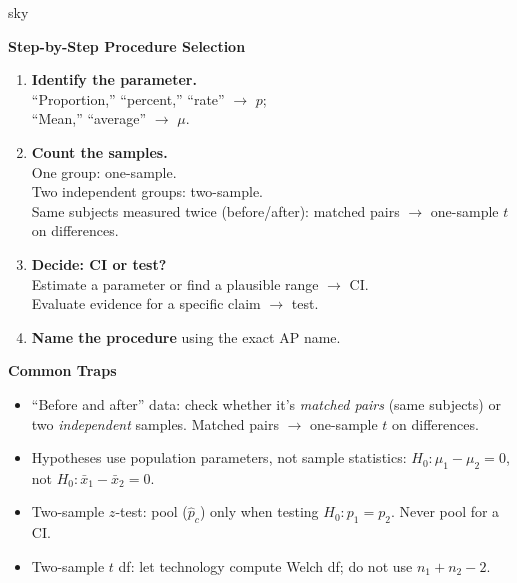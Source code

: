 \documentclass[10pt]{article}
\begin{document}
\begin{skillbox}{sky}
\begin{minipage}[t]{0.48\linewidth}
    \textbf{Step-by-Step Procedure Selection}
    \begin{enumerate}
        \item \textbf{Identify the parameter.}\\
              ``Proportion,'' ``percent,'' ``rate'' $\to$ $p$;\\
              ``Mean,'' ``average'' $\to$ $\mu$.
        \item \textbf{Count the samples.}\\
              One group: one-sample.\\
              Two independent groups: two-sample.\\
              Same subjects measured twice (before/after): matched pairs $\to$ one-sample $t$ on differences.
        \item \textbf{Decide: CI or test?}\\
              Estimate a parameter or find a plausible range $\to$ CI.\\
              Evaluate evidence for a specific claim $\to$ test.
        \item \textbf{Name the procedure} using the exact AP name.
    \end{enumerate}
\end{minipage}
\hfill
\begin{minipage}[t]{0.48\linewidth}
    \textbf{Common Traps}
    \begin{itemize}
        \item ``Before and after'' data: check whether it's \emph{matched pairs} (same subjects)
              or two \emph{independent} samples. Matched pairs $\to$ one-sample $t$ on differences.
        \item Hypotheses use population parameters, not sample statistics:
              $H_0: \mu_1 - \mu_2 = 0$, not $H_0: \bar x_1 - \bar x_2 = 0$.
        \item Two-sample $z$-test: pool ($\hat p_c$) only when testing $H_0: p_1 = p_2$.
              Never pool for a CI.
        \item Two-sample $t$ df: let technology compute Welch df; do not use $n_1+n_2-2$.
    \end{itemize}
\end{minipage}
\end{skillbox}
\end{document}
